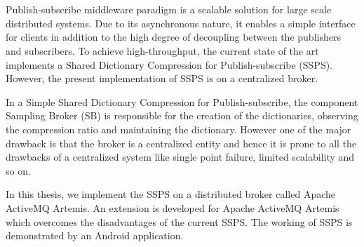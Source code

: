\chapter{\abstractname}
\setlength{\parskip}{1em}
\setlength\parindent{0pt}

Publish-subscribe middleware paradigm is a scalable solution for large scale distributed systems. Due to its asynchronous nature, it enables a simple interface for clients in addition to the high degree of decoupling between the publishers and subscribers. To achieve high-throughput, the current state of the art implements a Shared Dictionary Compression for Publish-subscribe (SSPS). However, the present implementation of SSPS is on a centralized broker.

In a Simple Shared Dictionary Compression for Publish-subscribe, the component Sampling Broker (SB) is responsible for the creation of the dictionaries, observing the compression ratio and maintaining the dictionary. However one of the major drawback is that the broker is a centralized entity and hence it is prone to all the drawbacks of a centralized system like single point failure, limited scalability and so on.

In this thesis, we implement the SSPS on a distributed broker called Apache ActiveMQ Artemis.
An extension is developed for Apache ActiveMQ Artemis which overcomes the disadvantages of the current SSPS. The working of SSPS is demonstrated by an Android application.



